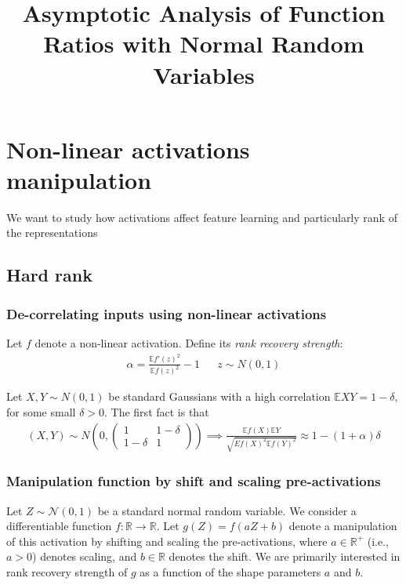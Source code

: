 \documentclass[11pt]{article}
\title{Asymptotic Analysis of Function Ratios with Normal Random Variables}
\author{}
\date{}
\newcommand{\E}{\mathbb{E}}
\begin{document}
\maketitle

\section{Non-linear activations manipulation }
We want to study how activations affect feature learning and particularly rank of the representations 

\subsection{Hard rank}

\subsubsection{De-correlating inputs using non-linear activations}
Let $f$ denote a non-linear activation. Define its \emph{rank recovery strength}:
\begin{align*}
    \alpha = \frac{\E f'(z)^2}{\E f(z)^2 } - 1 && z \sim N(0,1)
\end{align*}

Let $X,Y \sim N(0,1)$ be standard Gaussians with a high correlation  $\E X Y = 1-\delta, $ for some small $\delta > 0.$ The first fact is that 
\begin{align*}
   (X,Y)\sim N\left(0,\begin{pmatrix}
       1 & 1-\delta \\ 1-\delta & 1
   \end{pmatrix} \right) \implies  \frac{\E f(X) \E Y }{\sqrt{E f(X)^2 \E f(Y)^2 }}\approx 1 - (1+\alpha)\delta 
\end{align*}


\subsubsection{Manipulation function by shift and scaling pre-activations}

Let $Z \sim \mathcal{N}(0,1)$ be a standard normal random variable. We consider a differentiable function $f: \mathbb{R} \to \mathbb{R}$. Let $g(Z) = f(aZ+b)$ denote a manipulation of this activation by shifting and scaling the pre-activations,  where $a \in \mathbb{R}^+$ (i.e., $a>0$) denotes scaling, and $b \in \mathbb{R}$ denotes the shift. We are primarily interested in rank recovery strength of $g$ as a function of the shape parameters $a$ and $b.$ 
\end{document}
